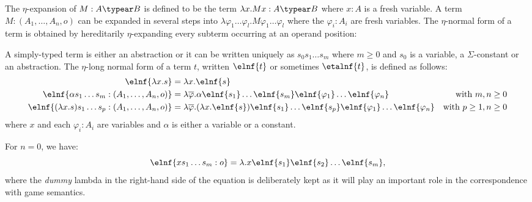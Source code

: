 The $\eta$-expansion of $M: A\typear B$ is defined to be the term
$\lambda x . M x : A\typear B$ where $x:A$ is a fresh variable. A
term $M : (A_1,\ldots,A_n,o)$ can be expanded in several steps into
$\lambda \varphi_1 \ldots \varphi_l . M \varphi_1 \ldots \varphi_l$
where the $\varphi_i:A_i$ are fresh variables. The $\eta$-normal
form of a term is obtained by hereditarily $\eta$-expanding every
subterm occurring at an operand position:
\begin{definition}
A simply-typed term is either an abstraction or it can be written uniquely as
$s_0 s_1 \ldots s_m$ where $m\geq0$ and $s_0$ is a variable, a $\Sigma$-constant or an abstraction.
The $\eta$-long normal form of a term $t$, written $\elnf{t}$ or sometimes $\etalnf{t}$,
is defined as follows:
\begin{align*}
\elnf{\lambda x . s } &= \lambda x . \elnf{s} \\
\elnf{\alpha s_1 \ldots s_m : (A_1,\ldots,A_n,o)} &= \lambda \overline{\varphi} . \alpha \elnf{s_1}\ldots \elnf{s_m} \elnf{\varphi_1} \ldots \elnf{\varphi_n}
& \mbox{with $m,n\geq0$}\\
\elnf{(\lambda x . s) s_1 \ldots s_p : (A_1,\ldots,A_n,o) } &= \lambda \overline{\varphi} . (\lambda x . \elnf{s}) \elnf{s_1} \ldots \elnf{s_p} \elnf{\varphi_1} \ldots \elnf{\varphi_n}
& \mbox{with $p\geq 1,n\geq 0$}
\end{align*}
where $x$ and each $\varphi_i : A_i$ are variables and $\alpha$ is
either a variable or a constant.
\end{definition}

For $n=0$, we have:
$$\elnf{x s_1 \ldots s_m : o} = \lambda . x \elnf{s_1} \elnf{s_2} \ldots \elnf{s_m},$$
where the \textsl{dummy} lambda in the right-hand side of the equation is deliberately kept as it will play an important role in the correspondence with game semantics.



